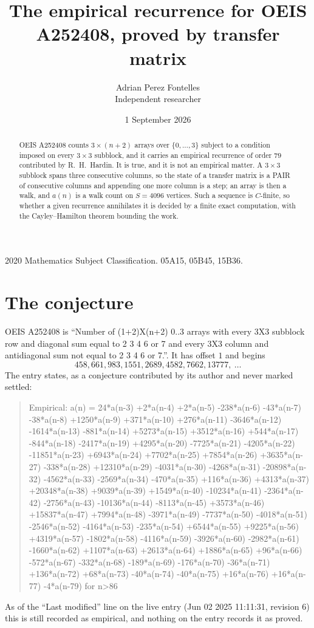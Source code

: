 \documentclass[11pt,a4paper]{article}
\title{The empirical recurrence for OEIS A252408, proved by transfer matrix}
\author{Adrian Perez Fontelles\\ \small Independent researcher}
\date{1 September 2026}
\theoremstyle{plain}
\theoremstyle{definition}
\begin{document}
\maketitle

\begin{abstract}
OEIS A252408 counts $3\times(n+2)$ arrays over $\{0,\dots,3\}$ subject to a condition imposed on
every $3\times3$ subblock, and it carries an empirical recurrence of order $79$
contributed by R.~H.~Hardin. It is true, and it is not an empirical matter. A $3\times3$
subblock spans three consecutive columns, so the state of a transfer matrix is a PAIR of
consecutive columns and appending one more column is a step; an array is then a walk, and
$a(n)$ is a walk count on $S=4096$ vertices. Such a sequence is $C$-finite, so whether a given
recurrence annihilates it is decided by a finite exact computation, with the Cayley--Hamilton
theorem bounding the work.
\end{abstract}

\noindent\small 2020 Mathematics Subject Classification. 05A15, 05B45, 15B36.\normalsize

\section{The conjecture}

OEIS A252408 is ``Number of (1+2)X(n+2) 0..3 arrays with every 3X3 subblock row and diagonal sum equal to 2 3 4 6 or 7 and every 3X3 column and antidiagonal sum not equal to 2 3 4 6 or 7.''. It has offset $1$ and begins
\[
458, 661, 983, 1551, 2689, 4582, 7662, 13777,\ \dots
\]
The entry states, as a conjecture contributed by its author and never marked settled:
\begin{quote}
Empirical: a(n) = 24*a(n-3) +2*a(n-4) +2*a(n-5) -238*a(n-6) -43*a(n-7) -38*a(n-8) +1250*a(n-9) +371*a(n-10) +276*a(n-11) -3646*a(n-12) -1614*a(n-13) -881*a(n-14) +5273*a(n-15) +3512*a(n-16) +544*a(n-17) -844*a(n-18) -2417*a(n-19) +4295*a(n-20) -7725*a(n-21) -4205*a(n-22) -11851*a(n-23) +6943*a(n-24) +7702*a(n-25) +7854*a(n-26) +3635*a(n-27) -338*a(n-28) +12310*a(n-29) -4031*a(n-30) -4268*a(n-31) -20898*a(n-32) -4562*a(n-33) -2569*a(n-34) -470*a(n-35) +116*a(n-36) +4313*a(n-37) +20348*a(n-38) +9039*a(n-39) +1549*a(n-40) -10234*a(n-41) -2364*a(n-42) -2756*a(n-43) -10136*a(n-44) -8113*a(n-45) +3573*a(n-46) +15837*a(n-47) +7994*a(n-48) -3971*a(n-49) -7737*a(n-50) -4018*a(n-51) -2546*a(n-52) -4164*a(n-53) -235*a(n-54) +6544*a(n-55) +9225*a(n-56) +4319*a(n-57) -1802*a(n-58) -4116*a(n-59) -3926*a(n-60) -2982*a(n-61) -1660*a(n-62) +1107*a(n-63) +2613*a(n-64) +1886*a(n-65) +96*a(n-66) -572*a(n-67) -332*a(n-68) -189*a(n-69) -176*a(n-70) -36*a(n-71) +136*a(n-72) +68*a(n-73) -40*a(n-74) -40*a(n-75) +16*a(n-76) +16*a(n-77) -4*a(n-79) for n>86
\end{quote}
As of the ``Last modified'' line on the live entry (Jun 02 2025 11:11:31, revision 6) this is still
recorded as empirical, and nothing on the entry records it as proved.
\end{document}
